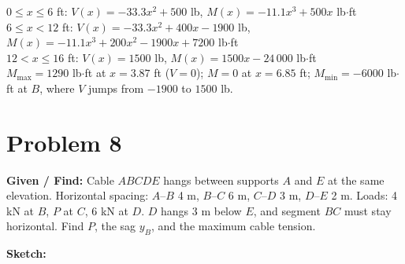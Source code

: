 \documentclass[11pt]{article}
\begin{document}
\begin{finalanswer}
$0 \le x \le 6$ ft: \quad $V(x) = -33.3x^2 + 500$ lb, \quad $M(x) = -11.1x^3 + 500x$ lb$\cdot$ft\\[4pt]
$6 \le x < 12$ ft: \quad $V(x) = -33.3x^2 + 400x - 1900$ lb, \quad $M(x) = -11.1x^3 + 200x^2 - 1900x + 7200$ lb$\cdot$ft\\[4pt]
$12 < x \le 16$ ft: \quad $V(x) = 1500$ lb, \quad $M(x) = 1500x - 24\,000$ lb$\cdot$ft\\[4pt]
$M_{\max} = 1290$ lb$\cdot$ft at $x = 3.87$ ft ($V = 0$); $M = 0$ at $x = 6.85$ ft; $M_{\min} = -6000$ lb$\cdot$ft at $B$, where $V$ jumps from $-1900$ to $1500$ lb.
\end{finalanswer}

\clearpage
\section*{Problem 8}

\textbf{Given / Find:} Cable $ABCDE$ hangs between supports $A$ and $E$ at the same elevation. Horizontal spacing: $A$--$B$ 4 m, $B$--$C$ 6 m, $C$--$D$ 3 m, $D$--$E$ 2 m. Loads: 4 kN at $B$, $P$ at $C$, 6 kN at $D$. $D$ hangs 3 m below $E$, and segment $BC$ must stay horizontal. Find $P$, the sag $y_B$, and the maximum cable tension.

\textbf{Sketch:}
\end{document}
